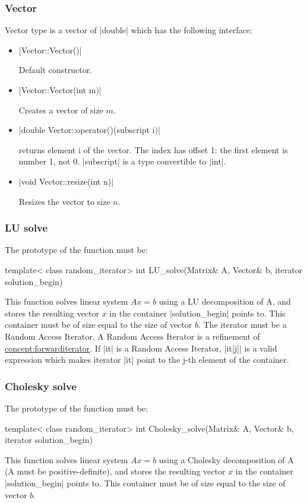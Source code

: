 \documentclass[12pt,twoside]{report}
\begin{document}
\htmlrule[CLEAR=all]  \subsubsection*{Vector}
Vector type is a vector of |double| which has the following interface:
\begin{itemize}
\item |Vector::Vector()|

Default constructor.

\item |Vector::Vector(int m)|

Creates a vector of size $m$.


\item |double Vector::operator()(subscript i)|

returns element i of the vector. The index has offset 1: the first element is number 1, not 0.
|subscript| is a type convertible to |int|.

\item |void Vector::resize(int n)|

Resizes the vector to size $n$.

\end{itemize}



\htmlrule[CLEAR=all]  \subsubsection*{LU solve}
The prototype of the function must be:
\begin{code}
template< class random_iterator>
int LU_solve(Matrix& A, Vector& b, iterator solution_begin)
\end{code}

This function solves linear system $Ax=b$ using a LU decomposition of A, and stores the resulting vector $x$ in the container |solution_begin| points to. This container must be of size equal to the size of vector $b$. The iterator must be a Random Access Iterator. A Random Access Iterator is a refinement of \hyperref{Forward Iterator}{Forward Iterator (see Section}{)}{concept:forwarditerator}. If |it| is a Random Access Iterator, |it[j]| is a valid expression which makes iterator |it| point to the j-th element of the container. 



\htmlrule[CLEAR=all]  \subsubsection*{Cholesky solve}
The prototype of the function must be:
\begin{code}
template< class random_iterator>
int Cholesky_solve(Matrix& A, Vector& b, iterator solution_begin)
\end{code}

This function solves linear system $Ax=b$ using a Cholesky decomposition of A (A must be positive-definite), and stores the resulting vector $x$ in the container |solution_begin| points to. This container must be of size equal to the size of vector $b$. 
\end{document}
